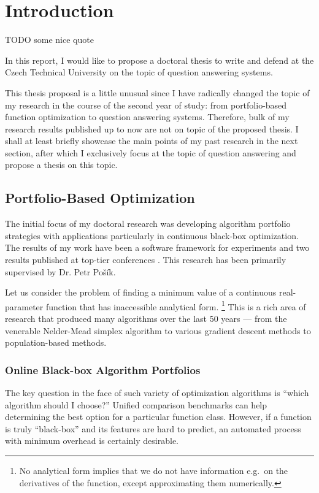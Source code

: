 \chapter{Introduction}
\label{ch:intro}

TODO some nice quote

In this report, I would like to propose a doctoral thesis to write
and defend at the Czech Technical University on the topic of question
answering systems.

This thesis proposal is a little unusual since I have radically changed
the topic of my research in the course of the second year of study:
from portfolio-based function optimization to question answering systems.
Therefore, bulk of my research results published up to now are not
on topic of the proposed thesis.  I shall at least briefly showcase
the main points of my past research in the next section,
after which I exclusively focus at the topic of question answering
and propose a thesis on this topic.

\section{Portfolio-Based Optimization}

The initial focus of my doctoral research
was developing algorithm portfolio strategies
with applications particularly in continuous black-box optimization.
The results of my work have been a software framework for experiments
\cite{COCOpf}
and two results published at top-tier conferences \cite{optpf,ndsqistep}.
This research has been primarily supervised by Dr. Petr Pošík.

Let us consider the problem of finding a minimum value of a continuous
real-parameter function that has inaccessible analytical form.%
\footnote{No analytical form implies that we do not have information
e.g.\ on the derivatives of the function, except approximating
them numerically.}
This is a rich area of research that produced many algorithms over
the last 50 years --- from the venerable Nelder-Mead simplex
algorithm \cite{NM1} to various gradient descent methods to
population-based methods.

\subsection{Online Black-box Algorithm Portfolios}

The key question in the face of such variety of optimization
algorithms is ``which algorithm should I choose?''
Unified comparison benchmarks \cite{COCO1}
can help determining the best option for a particular function class.
However, if a function is truly ``black-box'' and its features
are hard to predict, an automated process with minimum overhead
is certainly desirable.


